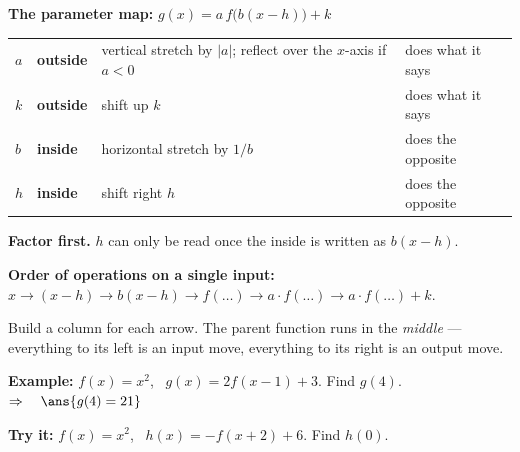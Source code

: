 \documentclass[12pt]{article}
\begin{document}

\begin{formulabox}
\textbf{The parameter map:} \quad
$g(x) = a\, f\bigl(b(x - h)\bigr) + k$\par\vspace{2pt}
\begin{tabular}{@{}llll@{}}
$a$ & \textbf{outside} & vertical stretch by $|a|$; reflect over the $x$-axis if $a < 0$ & does what it says\\
$k$ & \textbf{outside} & shift up $k$ & does what it says\\
$b$ & \textbf{inside} & horizontal stretch by $1/b$ & does the opposite\\
$h$ & \textbf{inside} & shift right $h$ & does the opposite\\
\end{tabular}\par\vspace{2pt}
\textbf{Factor first.} $h$ can only be read once the inside is written as $b(x-h)$.
\end{formulabox}


\begin{formulabox}
\textbf{Order of operations on a single input:} \ $x \to (x - h) \to b(x-h) \to f(\ldots)
\to a \cdot f(\ldots) \to a \cdot f(\ldots) + k$.\par
Build a column for each arrow. The parent function runs in the \emph{middle} --- everything
to its left is an input move, everything to its right is an output move.
\end{formulabox}

\begin{examplebox}
\textbf{Example:} \quad $f(x) = x^2$, \ $g(x) = 2f(x - 1) + 3$. Find $g(4)$.
$\Rightarrow\quad \ans{g(4) = 21}$
\end{examplebox}

\begin{tryitbox}
\textbf{Try it:} \quad $f(x) = x^2$, \ $h(x) = -f(x + 2) + 6$. Find $h(0)$.\\[2pt]
\end{tryitbox}
\end{document}
